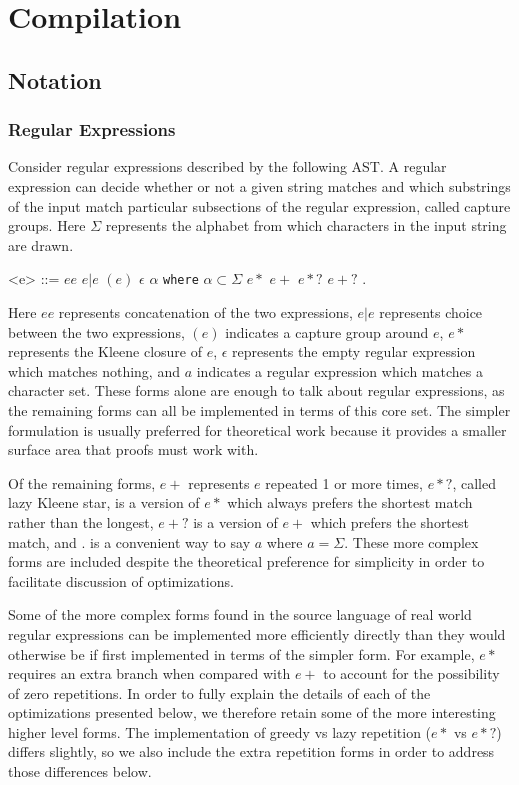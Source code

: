 \chapter{Compilation}
\label{chapter:compilation}

\section{Notation}

\subsection{Regular Expressions}

Consider regular expressions described by the following AST. A
regular expression can decide whether or not a given string
matches and which substrings of the input match particular
subsections of the regular expression, called capture groups.
Here $\Sigma$ represents the alphabet from which characters in
the input string are drawn.

\begin{grammar}
  <e> ::= $e e$
  \alt $e \rvert e$
  \alt $(e)$
  \alt $\epsilon$
  \alt $\alpha$ {\tt where} $\alpha \subset \Sigma$
  \alt $e*$
  \alt $e+$
  \alt $e*?$
  \alt $e+?$
  \alt $.$
\end{grammar}

Here $e e$ represents concatenation of the two expressions,
$e|e$ represents choice between the two expressions, $(e)$ indicates a
capture group around $e$, $e*$ represents the Kleene closure of $e$,
$\epsilon$ represents the empty regular expression which matches nothing,
and $a$ indicates a regular expression which matches a character set.
These forms alone are enough to talk about regular expressions, as
the remaining forms can all be implemented in terms of this core set.
The simpler formulation is usually preferred for theoretical work because
it provides a smaller surface area that proofs must work with. 

Of the remaining forms, $e+$ represents $e$ repeated 1 or more times,
$e*?$, called lazy Kleene star, is a version of $e*$ which always prefers
the shortest match rather than the longest, $e+?$ is a version of
$e+$ which prefers the shortest match, and $.$ is a convenient
way to say $a$ where $a = \Sigma$. These more complex forms are
included despite the theoretical preference for simplicity in
order to facilitate discussion of optimizations.

Some of the more complex forms found in the source language of real
world regular expressions can be implemented more efficiently directly
than they would otherwise be if first implemented in terms of the
simpler form. For example, $e*$ requires an extra branch when compared
with $e+$ to account for the possibility of zero repetitions.
In order to fully explain the details of each of the
optimizations presented below, we therefore retain some of the more
interesting higher level forms. The implementation of greedy vs lazy
repetition ($e*$ vs $e*?$) differs
slightly, so we also include the extra repetition forms in order to
address those differences below.

